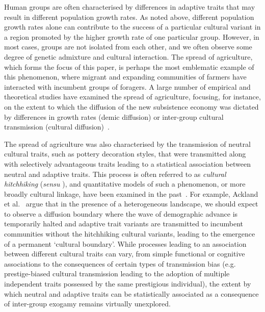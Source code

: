 \documentclass[9pt,twocolumn,twoside,lineno]{pnas-new}
\begin{document}
Human groups are often characterised by differences in adaptive traits that may result in different population growth rates. 
As noted above, different population growth rates alone can contribute to the success of a particular cultural variant in a region promoted by the higher growth rate of one particular group. However, in most cases, groups are not isolated from each other, and we often observe some degree of genetic admixture and cultural interaction. 
The spread of agriculture, which forms the focus of this paper, is perhaps the most emblematic example of this phenomenon, where migrant and expanding communities of farmers have interacted with incumbent groups of foragers.
A large number of empirical and theoretical studies have examined the spread of agriculture, focusing, for instance, on the extent to which the diffusion of the new subsistence economy was dictated by differences in growth rates (demic diffusion) or inter-group cultural transmission (cultural diffusion)~\citep{ammerman_neolithic_1984,fort_synthesis_2012,fort2022prehistoric,fort_prehistoric_2022}. 

The spread of agriculture was also characterised by the transmission of neutral cultural traits, such as pottery decoration styles, that were transmitted along with selectively advantageous traits leading to a statistical association between neutral and adaptive traits. 
This process is often referred to as \emph{cultural hitchhiking} (\textit{sensu} \citep{ackland_cultural_2007}), and 
quantitative models of such a phenomenon, or more broadly cultural linkage, have been examined in the past~\citep{ackland_cultural_2007,premo_hitchhikers_2012,yeh_cultural_2019,pardo-gordo_cultural_2021}. 
For example, Ackland et al.~\citep{ackland_cultural_2007} argue that in the presence of a heterogeneous landscape, we should expect to observe a diffusion boundary where the wave of demographic advance is temporarily halted and adaptive trait variants are transmitted to incumbent communities without the hitchhiking cultural variants, leading to the emergence of a permanent `cultural boundary'. 
While processes leading to an association between different cultural traits can vary, from simple functional or cognitive associations to the consequences of certain types of transmission bias (e.g. prestige-biased cultural transmission leading to the adoption of multiple independent traits possessed by the same prestigious individual), the extent by which neutral and adaptive traits can be statistically associated as a consequence of inter-group exogamy remains virtually unexplored.  
\end{document}
